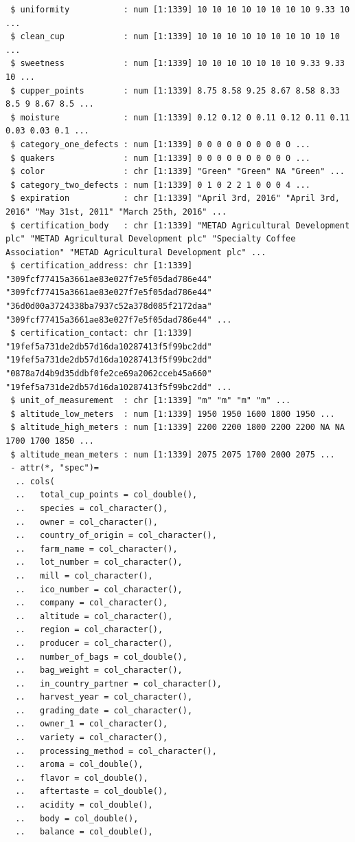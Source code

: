 \documentclass[
  letterpaper,
]{book}
\begin{document}
\begin{verbatim}
 $ uniformity           : num [1:1339] 10 10 10 10 10 10 10 10 9.33 10 ...
 $ clean_cup            : num [1:1339] 10 10 10 10 10 10 10 10 10 10 ...
 $ sweetness            : num [1:1339] 10 10 10 10 10 10 10 9.33 9.33 10 ...
 $ cupper_points        : num [1:1339] 8.75 8.58 9.25 8.67 8.58 8.33 8.5 9 8.67 8.5 ...
 $ moisture             : num [1:1339] 0.12 0.12 0 0.11 0.12 0.11 0.11 0.03 0.03 0.1 ...
 $ category_one_defects : num [1:1339] 0 0 0 0 0 0 0 0 0 0 ...
 $ quakers              : num [1:1339] 0 0 0 0 0 0 0 0 0 0 ...
 $ color                : chr [1:1339] "Green" "Green" NA "Green" ...
 $ category_two_defects : num [1:1339] 0 1 0 2 2 1 0 0 0 4 ...
 $ expiration           : chr [1:1339] "April 3rd, 2016" "April 3rd, 2016" "May 31st, 2011" "March 25th, 2016" ...
 $ certification_body   : chr [1:1339] "METAD Agricultural Development plc" "METAD Agricultural Development plc" "Specialty Coffee Association" "METAD Agricultural Development plc" ...
 $ certification_address: chr [1:1339] "309fcf77415a3661ae83e027f7e5f05dad786e44" "309fcf77415a3661ae83e027f7e5f05dad786e44" "36d0d00a3724338ba7937c52a378d085f2172daa" "309fcf77415a3661ae83e027f7e5f05dad786e44" ...
 $ certification_contact: chr [1:1339] "19fef5a731de2db57d16da10287413f5f99bc2dd" "19fef5a731de2db57d16da10287413f5f99bc2dd" "0878a7d4b9d35ddbf0fe2ce69a2062cceb45a660" "19fef5a731de2db57d16da10287413f5f99bc2dd" ...
 $ unit_of_measurement  : chr [1:1339] "m" "m" "m" "m" ...
 $ altitude_low_meters  : num [1:1339] 1950 1950 1600 1800 1950 ...
 $ altitude_high_meters : num [1:1339] 2200 2200 1800 2200 2200 NA NA 1700 1700 1850 ...
 $ altitude_mean_meters : num [1:1339] 2075 2075 1700 2000 2075 ...
 - attr(*, "spec")=
  .. cols(
  ..   total_cup_points = col_double(),
  ..   species = col_character(),
  ..   owner = col_character(),
  ..   country_of_origin = col_character(),
  ..   farm_name = col_character(),
  ..   lot_number = col_character(),
  ..   mill = col_character(),
  ..   ico_number = col_character(),
  ..   company = col_character(),
  ..   altitude = col_character(),
  ..   region = col_character(),
  ..   producer = col_character(),
  ..   number_of_bags = col_double(),
  ..   bag_weight = col_character(),
  ..   in_country_partner = col_character(),
  ..   harvest_year = col_character(),
  ..   grading_date = col_character(),
  ..   owner_1 = col_character(),
  ..   variety = col_character(),
  ..   processing_method = col_character(),
  ..   aroma = col_double(),
  ..   flavor = col_double(),
  ..   aftertaste = col_double(),
  ..   acidity = col_double(),
  ..   body = col_double(),
  ..   balance = col_double(),

\end{verbatim}
\end{document}
